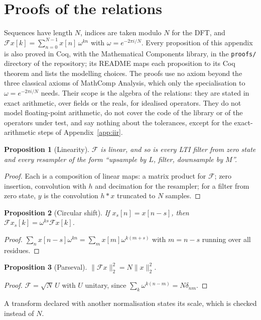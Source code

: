 \documentclass[10pt,conference]{IEEEtran}
\newtheorem{proposition}{Proposition}
\newcommand{\DFT}{\mathcal{F}}
\newcommand{\code}[1]{\texttt{#1}}
\begin{document}



\appendices

\section{Proofs of the relations}
\label{app:proofs}

Sequences have length $N$, indices are taken modulo $N$ for the DFT, and
$\DFT x[k]=\sum_{n=0}^{N-1}x[n]\,\omega^{kn}$ with $\omega=e^{-2\pi i/N}$.
Every proposition of this appendix is also proved in Coq, with the
Mathematical Components library, in the \code{proofs/} directory of the
repository; its README maps each proposition to its Coq theorem and lists the
modelling choices. The proofs use no axiom beyond the three classical axioms of
MathComp Analysis, which only the specialisation to $\omega=e^{-2\pi i/N}$
needs. Their scope is the algebra of the relations: they are stated in exact
arithmetic, over fields or the reals, for idealised operators. They do not
model floating-point arithmetic, do not cover the code of the library or of the
operators under test, and say nothing about the tolerances, except for the
exact-arithmetic steps of Appendix~\ref{app:iir}.

\begin{proposition}[Linearity] $\DFT$ is linear, and so is every LTI filter
from zero state and every resampler of the form ``upsample by $L$, filter,
downsample by $M$''.\end{proposition}
\begin{proof} Each is a composition of linear maps: a matrix product for
$\DFT$; zero insertion, convolution with $h$ and decimation for the resampler; for
a filter from zero state, $y$ is the convolution $h*x$ truncated to $N$ samples.
\end{proof}

\begin{proposition}[Circular shift] If $x_s[n]=x[n-s]$, then $\DFT x_s[k]=\omega^{ks}\DFT x[k]$.\end{proposition}
\begin{proof} $\sum_n x[n-s]\omega^{kn}=\sum_m x[m]\omega^{k(m+s)}$ with $m=n-s$
running over all residues.\end{proof}

\begin{proposition}[Parseval] $\|\DFT x\|_2^2=N\|x\|_2^2$.\end{proposition}
\begin{proof} $\DFT=\sqrt N\,U$ with $U$ unitary, since
$\sum_k\omega^{k(n-m)}=N\delta_{nm}$.\end{proof}
A transform declared with another normalisation states its scale, which is
checked instead of $N$.
\end{document}
